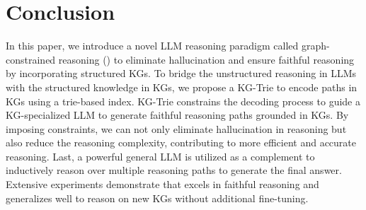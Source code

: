 \section{Conclusion}\label{sec:conclusion}
In this paper, we introduce a novel LLM reasoning paradigm called graph-constrained reasoning (\ourmethod) to eliminate hallucination and ensure faithful reasoning by incorporating structured KGs.
To bridge the unstructured reasoning in LLMs with the structured knowledge in KGs, we propose a KG-Trie to encode paths in KGs using a trie-based index. KG-Trie constrains the decoding process to guide a KG-specialized LLM to generate faithful reasoning paths grounded in KGs. By imposing constraints, we can not only eliminate hallucination in reasoning but also reduce the reasoning complexity, contributing to more efficient and accurate reasoning. Last, a powerful general LLM is utilized as a complement to inductively reason over multiple reasoning paths to generate the final answer. Extensive experiments demonstrate that \ourmethod excels in faithful reasoning and generalizes well to reason on new KGs without additional fine-tuning.